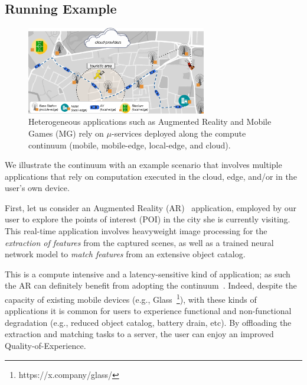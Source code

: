 
\subsection{Running Example}
\label{sub:example}

\begin{figure}[tbp]
	\includegraphics[width=0.7\textwidth]{figs/Continuum-Scenario}
	\setlength{\belowcaptionskip}{-10pt}
	\caption{Heterogeneous applications such as Augmented Reality and Mobile Games (MG) rely on $\mu$-services deployed along the compute continuum (mobile, mobile-edge, local-edge, and cloud).}
	\label{fig:continuum-scenario}
\end{figure}


We illustrate the continuum with an example scenario that involves multiple applications that rely on computation executed in the cloud, edge, and/or in the user's own device.

First, let us consider an Augmented Reality (AR)~\cite{GarrigaMendonca2017} application, employed by our user to explore the points of interest (POI) in the city she is currently visiting. This real-time application involves heavyweight image processing for the \textit{extraction of features} from the captured scenes, as well as a trained neural network model to \textit{match features} from an extensive object catalog. 

This is a compute intensive and a latency-sensitive kind of application; as such the AR can definitely benefit from adopting the continuum~\cite{beck2014mobile}. Indeed, despite the capacity of existing mobile devices (e.g., Glass~\footnote{https://x.company/glass/}), with these kinds of applications it is common for users to experience functional and non-functional degradation (e.g., reduced object catalog, battery drain, etc). By offloading the extraction and matching tasks to a server, the user can enjoy an improved Quality-of-Experience.

